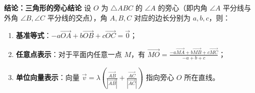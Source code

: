 \begin{statementbox}
\textbf{结论：三角形的旁心结论}
设 $O$ 为 $\triangle ABC$ 的 $\angle A$ 的旁心（即内角 $\angle A$ 平分线与外角 $\angle B, \angle C$ 平分线的交点），角 $A, B, C$ 对应的边长分别为 $a, b, c$，则：
\begin{enumerate}
    \item \textbf{基准等式}：$-a\vec{OA} + b\vec{OB} + c\vec{OC} = \vec{0}$；
    \item \textbf{任意点表示}：对于平面内任意一点 $M$，有 $\vec{MO} = \frac{-a\vec{MA} + b\vec{MB} + c\vec{MC}}{-a+b+c}$；
    \item \textbf{单位向量表示}：向量 $\vec{v} = \lambda \left( \frac{\vec{AB}}{|\vec{AB}|} + \frac{\vec{AC}}{|\vec{AC}|} \right)$ 指向旁心 $O$ 所在直线。
\end{enumerate}
\end{statementbox}